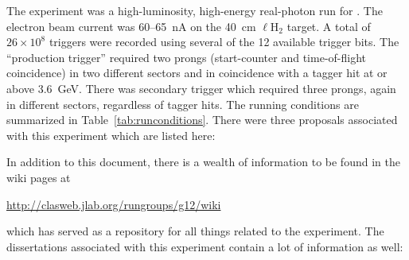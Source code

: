 The  experiment was a high-luminosity, high-energy real-photon run for . The electron beam current was 60--65~nA on the 40~cm $\ell$H$_2$ target. A total of $26\times 10^8$ triggers were recorded using several of the 12 available trigger bits. The ``production trigger'' required two prongs (start-counter and time-of-flight coincidence) in two different sectors and in coincidence with a tagger hit at or above 3.6~GeV. There was secondary trigger which required three prongs, again in different sectors, regardless of tagger hits. The running conditions are summarized in Table~\ref{tab:runconditions}. There were three proposals associated with this experiment which are listed here:

In addition to this document, there is a wealth of information to be found in the wiki pages at
\begin{center}
    \url{http://clasweb.jlab.org/rungroups/g12/wiki}
\end{center}
which has served as a repository for all things related to the  experiment. The dissertations associated with this experiment contain a lot of information as well:







